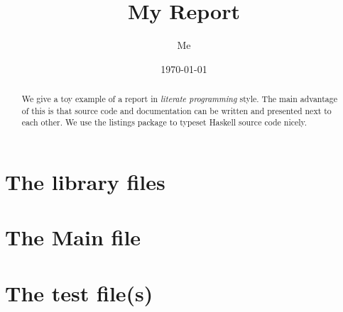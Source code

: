 \documentclass[12pt,a4paper]{article}
\title{My Report}
\author{Me}
\date{\today}
\begin{document}
\maketitle

\begin{abstract}
We give a toy example of a report in \emph{literate programming} style.
The main advantage of this is that source code and documentation can
be written and presented next to each other.
We use the listings package to typeset Haskell source code nicely.
\end{abstract}

\vfill

\tableofcontents

\clearpage




% 

\section{The library files}











\section{The Main file}



\section{The test file(s)}







\end{document}

